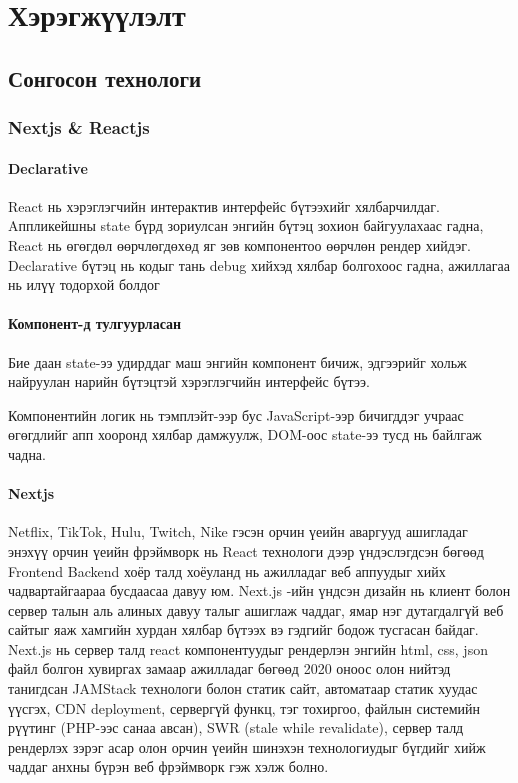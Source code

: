 \chapter{Хэрэгжүүлэлт}
\section{Сонгосон технологи}
\subsection{Nextjs \& Reactjs}
\subsubsection{Declarative}
React нь хэрэглэгчийн интерактив интерфейс бүтээхийг хялбарчилдаг. Aппликейшны state бүрд зориулсан энгийн бүтэц зохион байгуулахаас гадна, React нь өгөгдөл өөрчлөгдөхөд яг зөв компонентоо өөрчлөн рендер хийдэг. Declarative бүтэц нь кодыг тань debug хийхэд хялбар болгохоос гадна, ажиллагаа нь илүү тодорхой болдог

\subsubsection{Компонент-д тулгуурласан}
Бие даан state-ээ удирддаг маш энгийн компонент бичиж, эдгээрийг хольж найруулан нарийн бүтэцтэй хэрэглэгчийн интерфейс бүтээ.

Компонентийн логик нь тэмплэйт-ээр бус JavaScript-ээр бичигддэг учраас өгөгдлийг апп хооронд хялбар дамжуулж, DOM-оос state-ээ тусд нь байлгаж чадна.

\subsubsection{Nextjs}
Netflix, TikTok, Hulu, Twitch, Nike гэсэн орчин үеийн аваргууд ашигладаг энэхүү орчин үеийн фрэймворк нь React технологи дээр үндэслэгдсэн бөгөөд Frontend Backend хоёр талд хоёуланд нь ажилладаг веб аппуудыг хийх чадвартайгаараа бусдаасаа давуу юм. Next.js -ийн үндсэн дизайн нь клиент болон сервер талын аль алиных давуу талыг ашиглаж чаддаг, ямар нэг дутагдалгүй веб сайтыг яаж хамгийн хурдан хялбар бүтээх вэ гэдгийг бодож тусгасан байдаг. Next.js нь сервер талд react компонентуудыг рендерлэн энгийн html, css, json файл болгон хувиргах замаар ажилладаг бөгөөд 2020 оноос олон нийтэд танигдсан JAMStack технологи болон статик сайт, автоматаар статик хуудас үүсгэх, CDN deployment, сервергүй функц, тэг тохиргоо, файлын системийн рүүтинг (PHP-ээс санаа авсан), SWR (stale while revalidate), сервер талд рендерлэх зэрэг асар олон орчин үеийн шинэхэн технологиудыг бүгдийг хийж чаддаг анхны бүрэн веб фрэймворк гэж хэлж болно.\cite{Reactjs}
